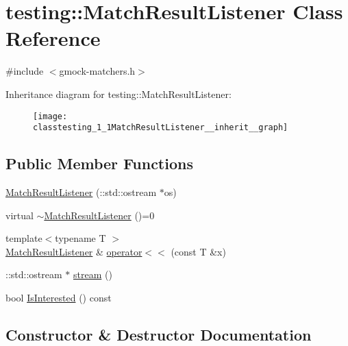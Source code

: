 \hypertarget{classtesting_1_1MatchResultListener}{}\section{testing\+:\+:Match\+Result\+Listener Class Reference}
\label{classtesting_1_1MatchResultListener}


{\ttfamily \#include $<$gmock-\/matchers.\+h$>$}



Inheritance diagram for testing\+:\+:Match\+Result\+Listener\+:\nopagebreak
\begin{figure}[H]
\begin{center}
\leavevmode
\texttt{[image: classtesting\_1\_1MatchResultListener\_\_inherit\_\_graph]}
\end{center}
\end{figure}
\subsection*{Public Member Functions}
\begin{DoxyCompactItemize}
\item 
\hyperlink{classtesting_1_1MatchResultListener_a245c360286cd0496d22a4d2fde80eb0b}{Match\+Result\+Listener} (\+::std\+::ostream $\ast$os)
\item 
virtual \hyperlink{classtesting_1_1MatchResultListener_aa29f43f7b2ffd850c721a8a33ccbba92}{$\sim$\+Match\+Result\+Listener} ()=0
\item 
{\footnotesize template$<$typename T $>$ }\\\hyperlink{classtesting_1_1MatchResultListener}{Match\+Result\+Listener} \& \hyperlink{classtesting_1_1MatchResultListener_a89f628a452635d1502a9062d9c864ebd}{operator$<$$<$} (const T \&x)
\item 
\+::std\+::ostream $\ast$ \hyperlink{classtesting_1_1MatchResultListener_a5abecb247e005f7f50a94898e3f44ee3}{stream} ()
\item 
bool \hyperlink{classtesting_1_1MatchResultListener_a68dc4f2f3c3425f4d4dd90ab02244615}{Is\+Interested} () const 
\end{DoxyCompactItemize}


\subsection{Constructor \& Destructor Documentation}

